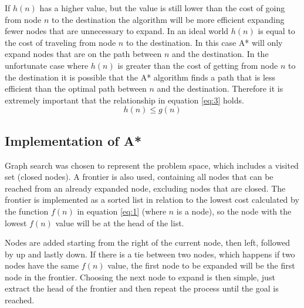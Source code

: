 \documentclass[12pt, a4paper]{article}
\begin{document}
If $h(n)$ has a higher value, but the value is still lower than the cost of going from node $n$ to the destination the algorithm will be more efficient expanding fewer nodes that are unnecessary to expand. In an ideal world $h(n)$ is equal to the cost of traveling from node $n$ to the destination. In this case A* will only expand nodes that are on the path between $n$ and the destination. In the unfortunate case where $h(n)$ is greater than the cost of getting from node $n$ to the destination it is possible that the A* algorithm finds a path that is less efficient than the optimal path between $n$ and the destination\cite{amit}. Therefore it is extremely important that the relationship in equation \ref{eq:3} holds.
\begin{equation} \label{eq:3}
h(n) \leq g(n)
\end{equation}

\subsection{Implementation of A*}

Graph search was chosen to represent the problem space, which includes a visited set (closed nodes). A frontier is also used, containing all nodes that can be reached from an already expanded node, excluding nodes that are closed. The frontier is implemented as a sorted list in relation to the lowest cost calculated by the function $f(n)$ in equation \ref{eq:1} (where $n$ is a node), so the node with the lowest $f(n)$ value will be at the head of the list.

Nodes are added starting from the right of the current node, then left, followed by up and lastly down. If there is a tie between two nodes, which happens if two nodes have the same $f(n)$ value, the first node to be expanded will be the first node in the frontier. Choosing the next node to expand is then simple, just extract the head of the frontier and then repeat the process until the goal is reached.

\end{document}
